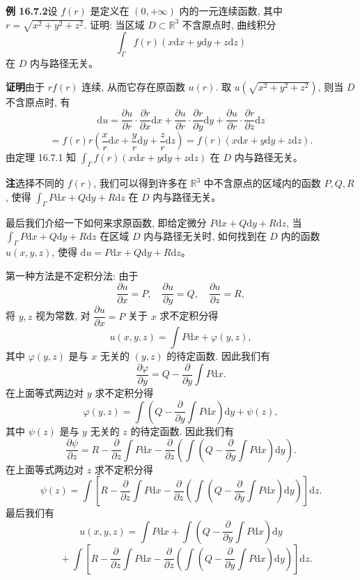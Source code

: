 \documentclass[UTF8,12pt,a4paper,fontset=fandol]{ctexart}
\begin{document}
\noindent\textbf{例 16.7.2}\quad 设 $f(r)$ 是定义在 $(0,+\infty)$ 内的一元连续函数, 其中 $r=\sqrt{x^2+y^2+z^2}$. 证明: 当区域 $D\subset\mathbb R^3$ 不含原点时, 曲线积分
\[
  \int_\Gamma f(r)(x\mathrm dx+y\mathrm dy+z\mathrm dz)
\]
在 $D$ 内与路径无关。

\noindent\textbf{证明}\quad 由于 $rf(r)$ 连续, 从而它存在原函数 $u(r)$. 取 $u(\sqrt{x^2+y^2+z^2})$, 则当 $D$ 不含原点时, 有
\[
  \mathrm du
  =\frac{\partial u}{\partial r}\cdot\frac{\partial r}{\partial x}\mathrm dx
  +\frac{\partial u}{\partial r}\cdot\frac{\partial r}{\partial y}\mathrm dy
  +\frac{\partial u}{\partial r}\cdot\frac{\partial r}{\partial z}\mathrm dz
\]
\[
  =f(r)r\left(\frac{x}{r}\mathrm dx+\frac{y}{r}\mathrm dy+\frac{z}{r}\mathrm dz\right)
  =f(r)(x\mathrm dx+y\mathrm dy+z\mathrm dz).
\]
由定理 16.7.1 知 $\int_\Gamma f(r)(x\mathrm dx+y\mathrm dy+z\mathrm dz)$ 在 $D$ 内与路径无关。

\noindent\textbf{注}\quad 选择不同的 $f(r)$, 我们可以得到许多在 $\mathbb R^3$ 中不含原点的区域内的函数 $P,Q,R$, 使得 $\int_\Gamma P\mathrm dx+Q\mathrm dy+R\mathrm dz$ 在 $D$ 内与路径无关。

最后我们介绍一下如何来求原函数, 即给定微分 $P\mathrm dx+Q\mathrm dy+R\mathrm dz$, 当 $\int_\Gamma P\mathrm dx+Q\mathrm dy+R\mathrm dz$ 在区域 $D$ 内与路径无关时, 如何找到在 $D$ 内的函数 $u(x,y,z)$, 使得 $\mathrm du=P\mathrm dx+Q\mathrm dy+R\mathrm dz$。

第一种方法是不定积分法: 由于
\[
  \frac{\partial u}{\partial x}=P,\quad
  \frac{\partial u}{\partial y}=Q,\quad
  \frac{\partial u}{\partial z}=R,
\]
将 $y,z$ 视为常数, 对 $\dfrac{\partial u}{\partial x}=P$ 关于 $x$ 求不定积分得
\[
  u(x,y,z)=\int P\mathrm dx+\varphi(y,z),
\]
其中 $\varphi(y,z)$ 是与 $x$ 无关的 $(y,z)$ 的待定函数. 因此我们有
\[
  \frac{\partial\varphi}{\partial y}
  =Q-\frac{\partial}{\partial y}\int P\mathrm dx.
\]
在上面等式两边对 $y$ 求不定积分得
\[
  \varphi(y,z)=\int\left(Q-\frac{\partial}{\partial y}\int P\mathrm dx\right)\mathrm dy+\psi(z),
\]
其中 $\psi(z)$ 是与 $y$ 无关的 $z$ 的待定函数. 因此我们有
\[
  \frac{\partial\psi}{\partial z}
  =
  R-\frac{\partial}{\partial z}\int P\mathrm dx
  -\frac{\partial}{\partial z}
  \left(\int\left(Q-\frac{\partial}{\partial y}\int P\mathrm dx\right)\mathrm dy\right).
\]
在上面等式两边对 $z$ 求不定积分得
\[
  \psi(z)=\int\left[
  R-\frac{\partial}{\partial z}\int P\mathrm dx
  -\frac{\partial}{\partial z}
  \left(\int\left(Q-\frac{\partial}{\partial y}\int P\mathrm dx\right)\mathrm dy\right)
  \right]\mathrm dz.
\]
最后我们有
\[
  u(x,y,z)=\int P\mathrm dx
  +\int\left(Q-\frac{\partial}{\partial y}\int P\mathrm dx\right)\mathrm dy
\]
\[
  \quad+\int\left[
  R-\frac{\partial}{\partial z}\int P\mathrm dx
  -\frac{\partial}{\partial z}
  \left(\int\left(Q-\frac{\partial}{\partial y}\int P\mathrm dx\right)\mathrm dy\right)
  \right]\mathrm dz.
\]
\end{document}
